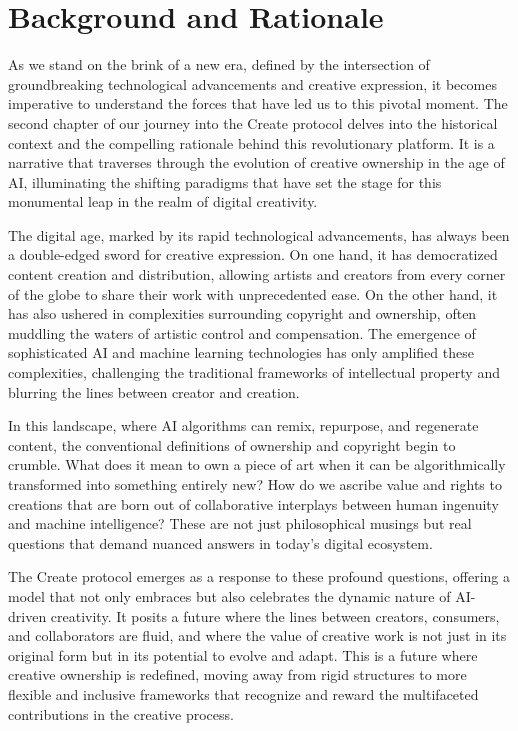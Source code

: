 \documentclass[12pt,a4paper]{article}
\begin{document}
\section{Background and Rationale}\label{sec:background}

As we stand on the brink of a new era, defined by the intersection of groundbreaking technological advancements and creative expression, it becomes imperative to understand the forces that have led us to this pivotal moment. The second chapter of our journey into the Create protocol delves into the historical context and the compelling rationale behind this revolutionary platform. It is a narrative that traverses through the evolution of creative ownership in the age of AI, illuminating the shifting paradigms that have set the stage for this monumental leap in the realm of digital creativity.

The digital age, marked by its rapid technological advancements, has always been a double-edged sword for creative expression. On one hand, it has democratized content creation and distribution, allowing artists and creators from every corner of the globe to share their work with unprecedented ease. On the other hand, it has also ushered in complexities surrounding copyright and ownership, often muddling the waters of artistic control and compensation. The emergence of sophisticated AI and machine learning technologies has only amplified these complexities, challenging the traditional frameworks of intellectual property and blurring the lines between creator and creation.

In this landscape, where AI algorithms can remix, repurpose, and regenerate content, the conventional definitions of ownership and copyright begin to crumble. What does it mean to own a piece of art when it can be algorithmically transformed into something entirely new? How do we ascribe value and rights to creations that are born out of collaborative interplays between human ingenuity and machine intelligence? These are not just philosophical musings but real questions that demand nuanced answers in today’s digital ecosystem.

The Create protocol emerges as a response to these profound questions, offering a model that not only embraces but also celebrates the dynamic nature of AI-driven creativity. It posits a future where the lines between creators, consumers, and collaborators are fluid, and where the value of creative work is not just in its original form but in its potential to evolve and adapt. This is a future where creative ownership is redefined, moving away from rigid structures to more flexible and inclusive frameworks that recognize and reward the multifaceted contributions in the creative process.
\end{document}
